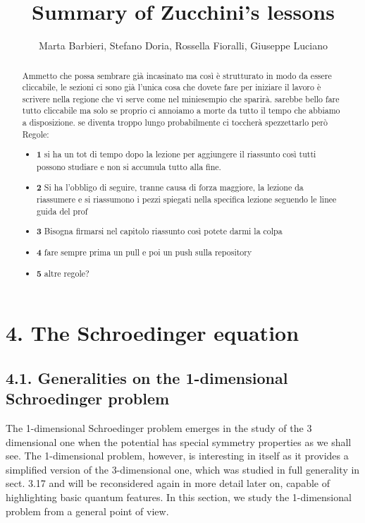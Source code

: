 \documentclass{article}
\title{Summary of Zucchini’s lessons}
\author{Marta Barbieri, Stefano Doria, Rossella Fioralli, Giuseppe Luciano}
\begin{document}
\maketitle
\begin{abstract}
    Ammetto che possa sembrare già incasinato ma così è strutturato in modo da essere cliccabile, le sezioni ci sono già l'unica cosa che dovete fare per iniziare il lavoro è scrivere nella regione che vi serve come nel miniesempio che sparirà. sarebbe bello fare tutto cliccabile ma solo se proprio ci annoiamo a morte da tutto il tempo che abbiamo a disposizione. se diventa troppo lungo probabilmente ci toccherà spezzettarlo però
    Regole:
    \begin{itemize}
\item \textbf{1} 
 si ha un tot di tempo dopo la lezione per aggiungere il riassunto così tutti possono studiare e non si accumula tutto alla fine. 
 
\item \textbf{2} 
Si ha l'obbligo di seguire, tranne causa di forza maggiore, la lezione da riassumere e si riassumono i pezzi spiegati nella specifica lezione seguendo le linee guida del prof 
\item \textbf{3}
Bisogna firmarsi nel capitolo riassunto così potete darmi la colpa
\item \textbf{4}
fare sempre prima un pull e poi un push sulla repository
\item \textbf{5}
altre regole?
\end{itemize}
   
\end{abstract}

\tableofcontents

\section*{4. The Schroedinger equation}

\subsection*{4.1. Generalities on the 1-dimensional Schroedinger problem}

The 1-dimensional Schroedinger problem emerges in the study of the 3 dimensional one when the potential has special symmetry properties as we shall see. The 1-dimensional problem, however, is interesting in itself as it provides a simplified version of the 3-dimensional one, which was studied in full generality in sect. 3.17 and will be reconsidered again in more detail later on, capable of highlighting basic quantum features. In this section, we study the 1-dimensional problem from a general point of view.
\end{document}
